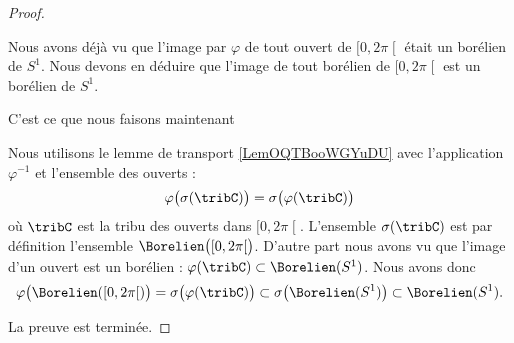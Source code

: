 \begin{proof}
\begin{subproof}
		\item[Pause]
		Nous avons déjà vu que l'image par \( \varphi\) de tout ouvert de \( \mathopen[ 0 , 2\pi \mathclose[\) était un borélien de \( S^1\). Nous devons en déduire que l'image de tout borélien de \( \mathopen[ 0 , 2\pi \mathclose[\) est un borélien de \( S^1\).

		C'est ce que nous faisons maintenant

		\item[Boréliens]
		Nous utilisons le lemme de transport \ref{LemOQTBooWGYuDU} avec l'application \( \varphi^{-1}\) et l'ensemble des ouverts :
		\begin{equation}
			\varphi\big( \sigma(\tribC) \big)=\sigma\big( \varphi(\tribC) \big)
		\end{equation}
		où \( \tribC\) est la tribu des ouverts dans \( \mathopen[ 0 , 2\pi \mathclose[\). L'ensemble \( \sigma(\tribC)\) est par définition l'ensemble \( \Borelien\big( \mathopen[ 0 , 2\pi \mathclose[ \big)\). D'autre part nous avons vu que l'image d'un ouvert est un borélien : \( \varphi(\tribC)\subset\Borelien(S^1)\). Nous avons donc
		\begin{equation}
			\varphi\big( \Borelien(\mathopen[ 0 , 2\pi \mathclose[) \big)=\sigma\big( \varphi(\tribC) \big)\subset\sigma\big( \Borelien(S^1) \big)\subset\Borelien(S^1).
		\end{equation}
	\end{subproof}
	La preuve est terminée.
\end{proof}

